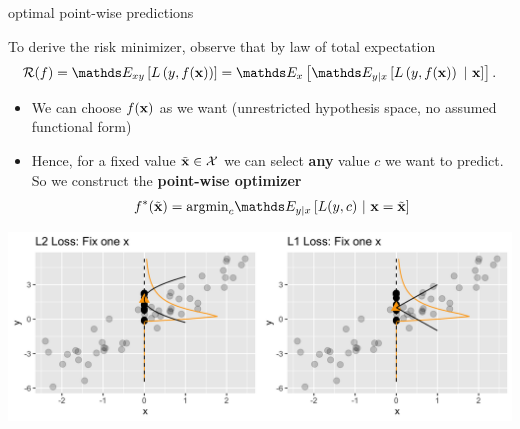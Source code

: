 \documentclass[11pt,compress,t,notes=noshow, xcolor=table]{beamer}
\begin{document}
\begin{frame}[t]{optimal point-wise predictions}  

To derive the risk minimizer, observe that by law of total expectation 
$$    \risk(f) = \E_{xy} \left[\Lxy\right] 
    = \E_x \left[\E_{y|x}\left[\Lxy~|~\xv\right]\right].$$

\begin{itemize}
	\item We can choose $f(\mathbf{x})$ as we want (unrestricted hypothesis space, no assumed functional form)
	\item Hence, for a fixed value $\tilde{\mathbf{x}} \in \mathcal{X}$ we can select \textbf{any} value $c$ we want to predict. So we construct the \textbf{point-wise optimizer} 
 $$\fbayes(\xtil) = \mbox{argmin}_c \E_{y|x}\left[L(y, c)~|~ \xv = \xtil \right] $$
\end{itemize}

\begin{center}
\includegraphics[width=1\textwidth]{figure/optimal_pointwise.png}
\end{center}


\end{frame}
\end{document}
